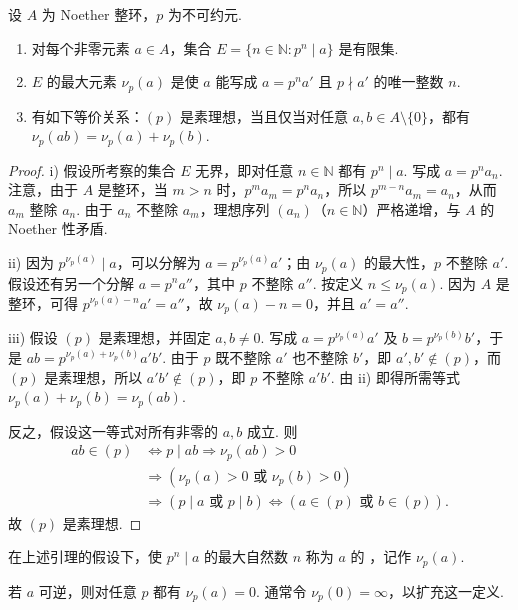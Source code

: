 \begin{lemma*}\hypertarget{galois-adic-valuation-lemma}{}
设 $A$ 为 Noether 整环，$p$ 为不可约元.
\begin{enumerate}[label=\roman*)]
\item 对每个非零元素 $a\in A$，集合 $E=\{n\in\mathbb N:p^n\mid a\}$ 是有限集.
\item $E$ 的最大元素 $\nu_p(a)$ 是使 $a$ 能写成 $a=p^na'$ 且 $p\nmid a'$ 的唯一整数 $n$.
\item 有如下等价关系：$(p)$ 是素理想，当且仅当对任意 $a,b\in A\setminus\{0\}$，都有 $\nu_p(ab)=\nu_p(a)+\nu_p(b)$.
\end{enumerate}
\end{lemma*}
\begin{proof}
i) 假设所考察的集合 $E$ 无界，即对任意 $n\in\mathbb N$ 都有 $p^n\mid a$. 写成 $a=p^na_n$. 注意，由于 $A$ 是整环，当 $m>n$ 时，$p^ma_m=p^na_n$，所以 $p^{m-n}a_m=a_n$，从而 $a_m$ 整除 $a_n$. 由于 $a_n$ 不整除 $a_m$，理想序列 $(a_n)$（$n\in\mathbb N$）严格递增，与 $A$ 的 Noether 性矛盾.

ii) 因为 $p^{\nu_p(a)}\mid a$，可以分解为 $a=p^{\nu_p(a)}a'$；由 $\nu_p(a)$ 的最大性，$p$ 不整除 $a'$. 假设还有另一个分解 $a=p^na''$，其中 $p$ 不整除 $a''$. 按定义 $n\leqslant\nu_p(a)$. 因为 $A$ 是整环，可得 $p^{\nu_p(a)-n}a'=a''$，故 $\nu_p(a)-n=0$，并且 $a'=a''$.

iii) 假设 $(p)$ 是素理想，并固定 $a,b\ne0$. 写成 $a=p^{\nu_p(a)}a'$ 及 $b=p^{\nu_p(b)}b'$，于是 $ab=p^{\nu_p(a)+\nu_p(b)}a'b'$. 由于 $p$ 既不整除 $a'$ 也不整除 $b'$，即 $a',b'\notin(p)$，而 $(p)$ 是素理想，所以 $a'b'\notin(p)$，即 $p$ 不整除 $a'b'$. 由 ii) 即得所需等式 $\nu_p(a)+\nu_p(b)=\nu_p(ab)$.

反之，假设这一等式对所有非零的 $a,b$ 成立. 则
\begin{align*}
ab\in(p)&\Leftrightarrow p\mid ab\Rightarrow\nu_p(ab)>0\\
&\Rightarrow(\nu_p(a)>0\text{ 或 }\nu_p(b)>0)\\
&\Rightarrow(p\mid a\text{ 或 }p\mid b)\Leftrightarrow(a\in(p)\text{ 或 }b\in(p)).
\end{align*}
故 $(p)$ 是素理想.
\end{proof}

\begin{definition*}
在上述引理的假设下，使 $p^n\mid a$ 的最大自然数 $n$ 称为 $a$ 的 ，记作 $\nu_p(a)$.
\end{definition*}
若 $a$ 可逆，则对任意 $p$ 都有 $\nu_p(a)=0$. 通常令 $\nu_p(0)=\infty$，以扩充这一定义.

